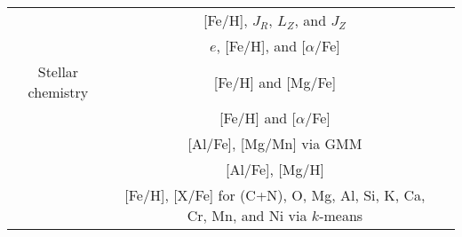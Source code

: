 \begin{table*}
\begin{tabular}{c|c|c}
        & [Fe/H], $J_R$, $L_Z$, and $J_Z$ & \citet{Myeong2018b} \\
        & $e$, [Fe/H], and [$\alpha$/Fe] & \citet{Naidu2020} \\
        \hline
        Stellar chemistry & [Fe/H] and [Mg/Fe] & \citet{DiMatteo2019, DiMatteo2020} \\
        & [Fe/H] and [$\alpha$/Fe] & \citet{Carollo2021} \\
        & [Al/Fe], [Mg/Mn] via GMM & \citet{Das2020} \\
        & [Al/Fe], [Mg/H] & \citet{Feuillet2021} \\
        & [Fe/H], [X/Fe] for (C+N), O, Mg, Al, Si, K, Ca, Cr, Mn, and Ni via $k$-means & \citet{Hayes2018} \\
        \hline
    \end{tabular}
    \label{tab:selection_techniques}
\end{table*}


